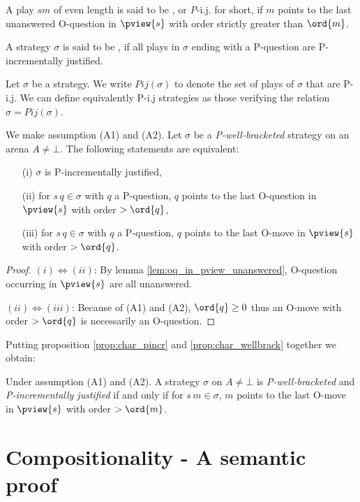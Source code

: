 \begin{definition}\rm
A play $s m$ of even length is said to be , or {\emph P-i.j.} for short, if $m$ points to the last unanswered O-question in $\pview{s}$ with order strictly greater than $\ord{m}$.

 A strategy $\sigma$ is said to be , if all plays in $\sigma$ ending with a P-question are
P-incrementally justified.
\end{definition}
Let $\sigma$ be a strategy. We write $Pij(\sigma)$ to denote the set of plays of $\sigma$ that are P-i.j.
We can define equivalently P-i.j strategies as those verifying the relation $\sigma = Pij(\sigma)$.
\begin{proposition}
\label{prop:char_pincr}
\rm We make assumption (A1) and (A2).
Let $\sigma$ be a \emph{P-well-bracketed} strategy on an arena $A\neq \bot$.
The following statements are equivalent:
\begin{enumerate}
\item[(i)] $\sigma$ is P-incrementally justified,
\item[(ii)] for $s \, q \in \sigma$ with $q$ a P-question, $q$ points to the last O-question in $\pview{s}$ with order $>\ord{q}$,
\item[(iii)] for $s \, q \in \sigma$ with $q$ a P-question, $q$ points to the last O-move in $\pview{s}$ with order $>\ord{q}$.
\end{enumerate}
\end{proposition}
\begin{proof}
$(i)\iff(ii)$: By lemma \ref{lem:oq_in_pview_unanswered}, O-question occurring in $\pview{s}$ are all unanswered.

$(ii)\iff(iii)$: Because of (A1) and (A2), $\ord{q} \geq 0$ thus an O-move with order $>\ord{q}$ is necessarily an O-question.
\end{proof}

Putting proposition \ref{prop:char_pincr} and
\ref{prop:char_wellbrack} together we obtain:
\begin{proposition}
Under assumption (A1) and (A2).
A strategy $\sigma$ on $A\neq \bot$
is \emph{P-well-bracketed} and
 \emph{P-incrementally justified} if and only if
for $s \, m \in \sigma$, $m$ points to the last O-move in $\pview{s}$ with order $>\ord{m}$.
\end{proposition}




\section{Compositionality - A semantic proof}
\label{sec:compos-semantic}

